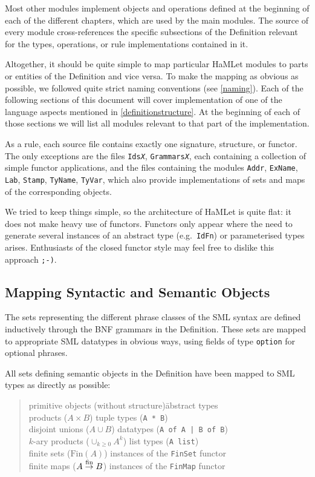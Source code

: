 \documentclass[twoside,titlepage]{article}
\begin{document}
Most other modules implement objects and operations defined at the beginning of each of the different chapters, which are used by the main modules. The source of every module cross-references the specific subsections of the Definition relevant for the types, operations, or rule implementations contained in it.

Altogether, it should be quite simple to map particular HaMLet modules to parts or entities of the Definition and vice versa. To make the mapping as obvious as possible, we followed quite strict naming conventions (see \ref{naming}). Each of the following sections of this document will cover implementation of one of the language aspects mentioned in \ref{definitionstructure}. At the beginning of each of those sections we will list all modules relevant to that part of the implementation.

As a rule, each source file contains exactly one signature, structure, or functor. The only exceptions are the files {\tt Ids{\sl{X}}}, {\tt Grammars{\sl{X}}}, each containing a collection of simple functor applications, and the files containing the modules {\tt Addr}, {\tt ExName}, {\tt Lab}, {\tt Stamp}, {\tt TyName}, {\tt TyVar}, which also provide implementations of sets and maps of the corresponding objects.

We tried to keep things simple, so the architecture of HaMLet is quite flat: it does not make heavy use of functors. Functors only appear where the need to generate several instances of an abstract type (e.g.\ {\tt IdFn}) or parameterised types arises. Enthusiasts of the closed functor style may feel free to dislike this approach {\tt ;-)}.


\subsection{Mapping Syntactic and Semantic Objects}
\label{mapping}

The sets representing the different phrase classes of the SML syntax are defined inductively through the BNF grammars in the Definition. These sets are mapped to appropriate SML datatypes in obvious ways, using fields of type {\tt option} for optional phrases.

All sets defining semantic objects in the Definition have been mapped to SML types as directly as possible:

\begin{quote}
\begin{tabbing}
primitive objects (without structure)\qquad\= abstract types \\
products ($A \times B$)			\> tuple types ({\tt A * B}) \\
disjoint unions ($A \cup B$)		\> datatypes ({\tt A of A | B of B}) \\
$k$-ary products ($\cup_{k\geq0} A^k$)	\> list types ({\tt A list}) \\
finite sets ($\mbox{Fin}(A)$)		\> instances of the {\tt FinSet} functor \\
finite maps ($A \stackrel{\mbox{\scriptsize fin}}{\rightarrow} B$)		\> instances of the {\tt FinMap} functor \\
\end{tabbing}
\end{quote}
\end{document}
